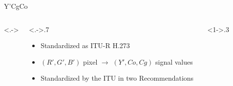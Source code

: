 \documentclass[aspectratio=169,handout,usepdftitle=false]{fireshonks}
\begin{document}
\begin{frame}{Y'CgCo}
    \begin{columns}<.->
        \begin{column}<.->{.7\textwidth}
            \begin{itemize}
                \item Standardized as ITU-R H.273 \parencite*{ycocg}
                \item $(R', G', B')$ pixel $\rightarrow$ $(Y', Co, Cg)$ signal values
                \item Standardized by the ITU in two Recommendations
            \end{itemize}
        \end{column}
        \begin{column}<1->{.3\textwidth}
            \begin{figure}

\end{figure}
\end{column}
\end{columns}
\end{frame}
\end{document}

